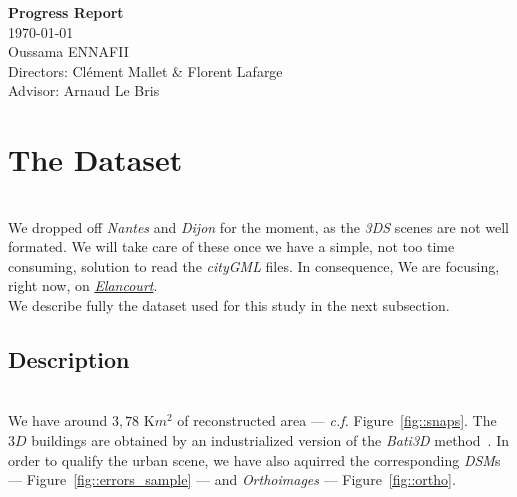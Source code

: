 \documentclass[a4paper, 11pt]{article}
\begin{document}
	\begin{centering}
		\Large{\textbf{Progress Report}}\\
		\large{\today}
~\\
		Oussama ENNAFII\\
		Directors: Cl\'ement Mallet \& Florent Lafarge \\
		Advisor: Arnaud Le Bris \\

	\end{centering}


	\section{The Dataset}
~\\

	We dropped off \textit{Nantes} and \textit{Dijon} for the moment, as the \textit{3DS} scenes are not well formated. We will take care of these once we have a simple, not too time consuming, solution to read the \textit{cityGML} files. In consequence, We are focusing, right now, on \href{https://www.google.fr/maps/place/%C3%89lancourt/@48.7781732,1.9536264,5868m/data=!3m1!1e3!4m13!1m7!3m6!1s0x47e68370e965167b:0x705d83a4167c877c!2s%C3%89lancourt!3b1!8m2!3d48.782907!4d1.960077!3m4!1s0x47e68370e965167b:0x705d83a4167c877c!8m2!3d48.782907!4d1.960077}{\textit{Elancourt}}.\\

	We describe fully the dataset used for this study in the next subsection.

	\subsection{Description}
~\\

	We have around $3,78\text{ K}m^2$ of reconstructed area --- \textit{c.f.} Figure~\ref{fig::snaps}. The $3D$ buildings are obtained by an industrialized version of the \textit{Bati3D} method~\cite{durupt2006automatic, taillandier2004automatic}. In order to qualify the urban scene, we have also aquirred the corresponding \textit{DSM}s --- Figure~\ref{fig::errors_sample} --- and \textit{Orthoimages} --- Figure~\ref{fig::ortho}.
\end{document}

